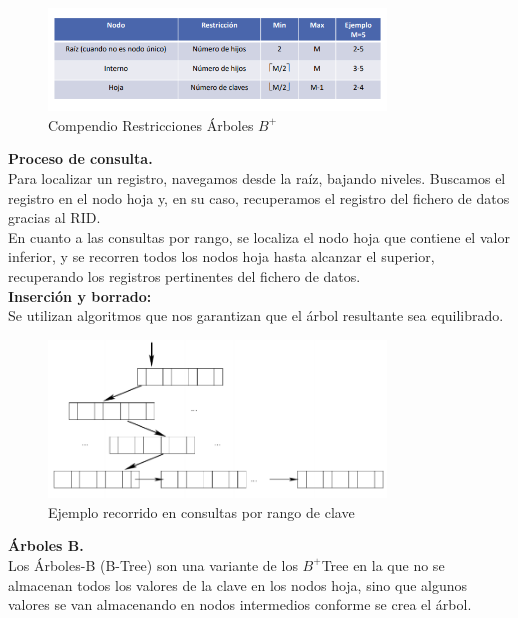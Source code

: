\documentclass[a4paper,11pt]{article}
\begin{document}
\begin{figure}
\centering
\caption{Compendio Restricciones Árboles $B^+$}
\includegraphics[scale=1,width=0.8\textwidth]{compendio_restricciones.png}
\end{figure}

\textbf{Proceso de consulta.}  \\

Para localizar un registro, navegamos desde la raíz, bajando niveles. Buscamos el registro en el nodo hoja y, en su caso, recuperamos el registro del fichero de datos gracias al RID. \\

En cuanto a las consultas por rango, se localiza el nodo hoja que contiene el valor inferior, y se recorren todos los nodos hoja hasta alcanzar el superior, recuperando los registros pertinentes del fichero de datos. \\

\textbf{Inserción y borrado:} \\

Se utilizan algoritmos que nos garantizan que el árbol resultante sea equilibrado.

\begin{figure}[h]
\centering
\caption{Ejemplo recorrido en consultas por rango de clave}
\includegraphics[scale=1,width=0.8\textwidth]{recorrido_arbol.png}
\end{figure}

\textbf{Árboles B.} \\

Los Árboles-B (B-Tree) son una variante de los $B^+$Tree en la que no se almacenan todos los valores de la clave en los nodos hoja, sino que algunos valores se van almacenando en nodos intermedios conforme se crea el árbol. \\
\end{document}
